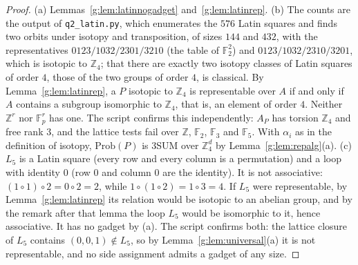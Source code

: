 \documentclass[11pt]{article}
\theoremstyle{definition}
\theoremstyle{remark}
\newcommand{\Z}{\mathbb{Z}}
\newcommand{\F}{\mathbb{F}_2}
\newcommand{\Fp}{\mathbb{F}_p}
\newcommand{\Prob}{\mathrm{Prob}}
\begin{document}
\begin{proof}
(a) Lemmas~\ref{g:lem:latinnogadget} and~\ref{g:lem:latinrep}.
(b) The counts are the output of \texttt{q2\_latin.py}, which enumerates the $576$ Latin squares and finds two orbits under isotopy and transposition, of sizes $144$ and $432$, with the representatives $0123/1032/2301/3210$ (the table of $\F^2$) and $0123/1032/2310/3201$, which is isotopic to $\Z_4$; that there are exactly two isotopy classes of Latin squares of order $4$, those of the two groups of order $4$, is classical. By Lemma~\ref{g:lem:latinrep}, a $P$ isotopic to $\Z_4$ is representable over $A$ if and only if $A$ contains a subgroup isomorphic to $\Z_4$, that is, an element of order $4$. Neither $\Z^r$ nor $\Fp^r$ has one. The script confirms this independently: $A_P$ has torsion $\Z_4$ and free rank $3$, and the lattice tests fail over $\Z$, $\F$, $\mathbb F_3$ and $\mathbb F_5$. With $\alpha_i$ as in the definition of isotopy, $\Prob(P)$ is 3SUM over $\Z_4^d$ by Lemma~\ref{g:lem:repalg}(a).
(c) $L_5$ is a Latin square (every row and every column is a permutation) and a loop with identity $0$ (row $0$ and column $0$ are the identity). It is not associative: $(1\circ1)\circ2=0\circ2=2$, while $1\circ(1\circ2)=1\circ3=4$. If $L_5$ were representable, by Lemma~\ref{g:lem:latinrep} its relation would be isotopic to an abelian group, and by the remark after that lemma the loop $L_5$ would be isomorphic to it, hence associative. It has no gadget by (a). The script confirms both: the lattice closure of $L_5$ contains $(0,0,1)\notin L_5$, so by Lemma~\ref{g:lem:universal}(a) it is not representable, and no side assignment admits a gadget of any size.


\end{proof}
\end{document}
